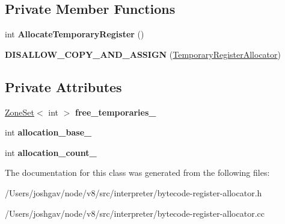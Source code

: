 \subsection*{Private Member Functions}
\begin{DoxyCompactItemize}
\item 
int {\bfseries Allocate\+Temporary\+Register} ()\hypertarget{classv8_1_1internal_1_1interpreter_1_1_temporary_register_allocator_a79296c6c17e4670af5e7a3f923aec05a}{}\label{classv8_1_1internal_1_1interpreter_1_1_temporary_register_allocator_a79296c6c17e4670af5e7a3f923aec05a}

\item 
{\bfseries D\+I\+S\+A\+L\+L\+O\+W\+\_\+\+C\+O\+P\+Y\+\_\+\+A\+N\+D\+\_\+\+A\+S\+S\+I\+GN} (\hyperlink{classv8_1_1internal_1_1interpreter_1_1_temporary_register_allocator}{Temporary\+Register\+Allocator})\hypertarget{classv8_1_1internal_1_1interpreter_1_1_temporary_register_allocator_a39c6dd3123eb4b48db035e57040d08b5}{}\label{classv8_1_1internal_1_1interpreter_1_1_temporary_register_allocator_a39c6dd3123eb4b48db035e57040d08b5}

\end{DoxyCompactItemize}
\subsection*{Private Attributes}
\begin{DoxyCompactItemize}
\item 
\hyperlink{classv8_1_1internal_1_1_zone_set}{Zone\+Set}$<$ int $>$ {\bfseries free\+\_\+temporaries\+\_\+}\hypertarget{classv8_1_1internal_1_1interpreter_1_1_temporary_register_allocator_a149008d7151d176d8527c4a2c0fc99b9}{}\label{classv8_1_1internal_1_1interpreter_1_1_temporary_register_allocator_a149008d7151d176d8527c4a2c0fc99b9}

\item 
int {\bfseries allocation\+\_\+base\+\_\+}\hypertarget{classv8_1_1internal_1_1interpreter_1_1_temporary_register_allocator_a1ddde678bb2b9276971577278d3ff5ba}{}\label{classv8_1_1internal_1_1interpreter_1_1_temporary_register_allocator_a1ddde678bb2b9276971577278d3ff5ba}

\item 
int {\bfseries allocation\+\_\+count\+\_\+}\hypertarget{classv8_1_1internal_1_1interpreter_1_1_temporary_register_allocator_a667d8d5d30945788faa1729474742330}{}\label{classv8_1_1internal_1_1interpreter_1_1_temporary_register_allocator_a667d8d5d30945788faa1729474742330}

\end{DoxyCompactItemize}


The documentation for this class was generated from the following files\+:\begin{DoxyCompactItemize}
\item 
/\+Users/joshgav/node/v8/src/interpreter/bytecode-\/register-\/allocator.\+h\item 
/\+Users/joshgav/node/v8/src/interpreter/bytecode-\/register-\/allocator.\+cc\end{DoxyCompactItemize}
